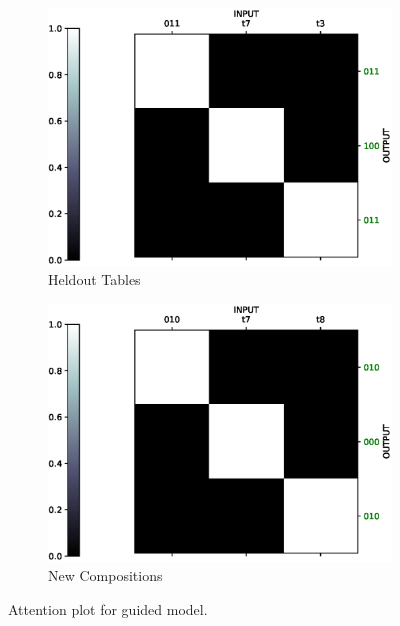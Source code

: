 \begin{figure}[ht] 
	\begin{subfigure}[b]{0.5\linewidth}
		\centering
		\includegraphics[width=0.95\linewidth]{./figs/lookup/attn/learned1-eps}
		\caption{Heldout Tables} 
		\label{lrn_attn1} 
		\vspace{2ex}
	\end{subfigure}%
	\begin{subfigure}[b]{0.5\linewidth}
		\centering
		\includegraphics[width=0.95\linewidth]{./figs/lookup/attn/learned2-eps}
		\caption{New Compositions} 
		\label{lrn_attn2} 
		\vspace{2ex}
	\end{subfigure}
	\caption{Attention plot for guided model.}
	\label{lrn_attn}
\end{figure}

